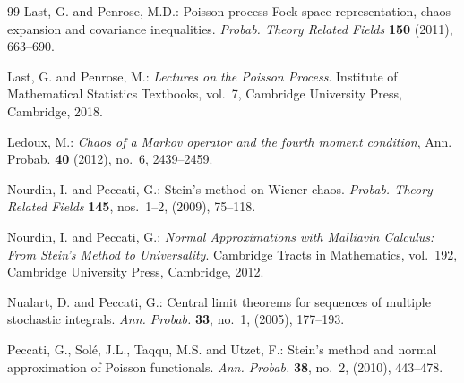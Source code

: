 \documentclass[ECP,preprint]{ejpecp}
\begin{document}
\begin{thebibliography}{99}
Last, G. and Penrose, M.D.:
Poisson process Fock space representation, chaos expansion and
covariance inequalities.
\emph{Probab. Theory Related Fields} \textbf{150} (2011), 663--690.


Last, G. and Penrose, M.:
\emph{Lectures on the Poisson Process}.
Institute of Mathematical Statistics Textbooks, vol.~7,
Cambridge University Press, Cambridge, 2018.




 Ledoux, M.:
{\it Chaos of a Markov operator and the fourth moment condition},
Ann. Probab. {\bf 40} (2012), no.~6, 2439--2459.



Nourdin, I. and Peccati, G.:
Stein's method on Wiener chaos.
\emph{Probab. Theory Related Fields}
\textbf{145}, nos.~1--2, (2009), 75--118.


Nourdin, I. and Peccati, G.:
\emph{Normal Approximations with Malliavin Calculus:
From Stein's Method to Universality}.
Cambridge Tracts in Mathematics, vol.~192,
Cambridge University Press, Cambridge, 2012.


Nualart, D. and Peccati, G.:
Central limit theorems for sequences of multiple stochastic integrals.
\emph{Ann. Probab.} \textbf{33}, no.~1, (2005), 177--193.

Peccati, G., Sol\'e, J.L., Taqqu, M.S. and Utzet, F.:
Stein's method and normal approximation of Poisson functionals.
\emph{Ann. Probab.} \textbf{38}, no.~2, (2010), 443--478.







\end{thebibliography}
\end{document}
